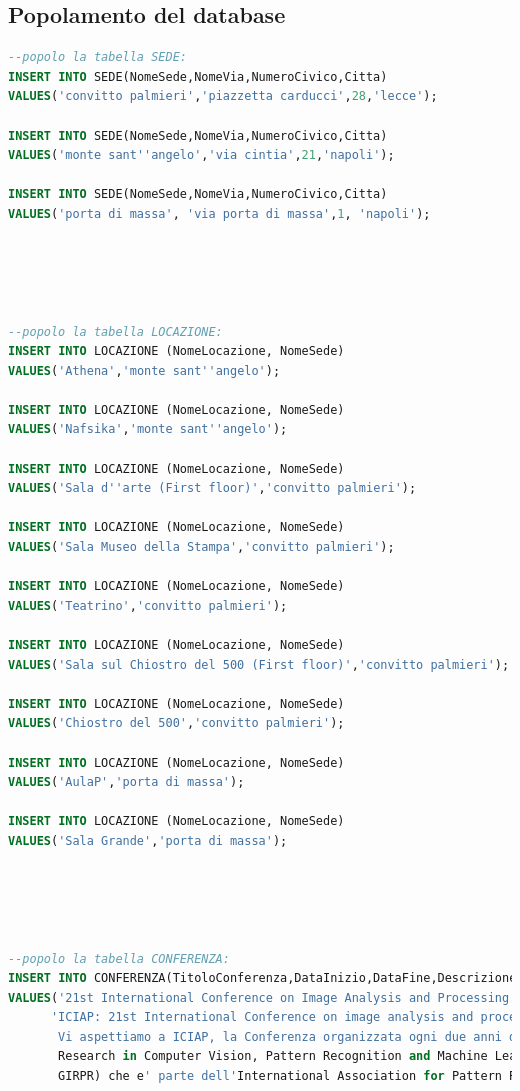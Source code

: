 \documentclass[a4page]{article}
\begin{document}
\subsection{Popolamento del database}
\begin{lstlisting}[language=SQL,
        deletekeywords={IDENTITY,INT},
        morekeywords={clustered},    
        framesep=10pt,
        framextopmargin=10pt]
--popolo la tabella SEDE:
INSERT INTO SEDE(NomeSede,NomeVia,NumeroCivico,Citta)
VALUES('convitto palmieri','piazzetta carducci',28,'lecce');

INSERT INTO SEDE(NomeSede,NomeVia,NumeroCivico,Citta)
VALUES('monte sant''angelo','via cintia',21,'napoli');

INSERT INTO SEDE(NomeSede,NomeVia,NumeroCivico,Citta)
VALUES('porta di massa', 'via porta di massa',1, 'napoli');





--popolo la tabella LOCAZIONE:
INSERT INTO LOCAZIONE (NomeLocazione, NomeSede)
VALUES('Athena','monte sant''angelo');

INSERT INTO LOCAZIONE (NomeLocazione, NomeSede)
VALUES('Nafsika','monte sant''angelo');

INSERT INTO LOCAZIONE (NomeLocazione, NomeSede)
VALUES('Sala d''arte (First floor)','convitto palmieri');

INSERT INTO LOCAZIONE (NomeLocazione, NomeSede)
VALUES('Sala Museo della Stampa','convitto palmieri');

INSERT INTO LOCAZIONE (NomeLocazione, NomeSede)
VALUES('Teatrino','convitto palmieri');

INSERT INTO LOCAZIONE (NomeLocazione, NomeSede)
VALUES('Sala sul Chiostro del 500 (First floor)','convitto palmieri');

INSERT INTO LOCAZIONE (NomeLocazione, NomeSede)
VALUES('Chiostro del 500','convitto palmieri');

INSERT INTO LOCAZIONE (NomeLocazione, NomeSede)
VALUES('AulaP','porta di massa');

INSERT INTO LOCAZIONE (NomeLocazione, NomeSede)
VALUES('Sala Grande','porta di massa');





--popolo la tabella CONFERENZA:
INSERT INTO CONFERENZA(TitoloConferenza,DataInizio,DataFine,Descrizione,NomeSede)
VALUES('21st International Conference on Image Analysis and Processing', '23/05/2022','27/05/2022',
	  'ICIAP: 21st International Conference on image analysis and processing 24 May 2022
	   Vi aspettiamo a ICIAP, la Conferenza organizzata ogni due anni dall'Association for
	   Research in Computer Vision, Pattern Recognition and Machine Learning (CVPL, ex
	   GIRPR) che e' parte dell'International Association for Pattern Recognition (IAPR).','convitto palmieri');
	   

\end{lstlisting}
\end{document}
